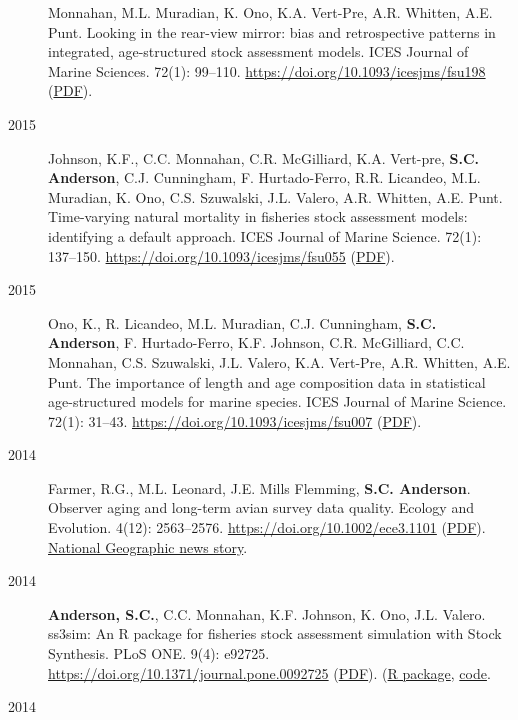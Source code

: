 \begin{description}
Monnahan, M.L. Muradian, K. Ono, K.A. Vert-Pre, A.R. Whitten, A.E. Punt.
Looking in the rear-view mirror: bias and retrospective patterns in
integrated, age-structured stock assessment models. ICES Journal of
Marine Sciences. 72(1): 99--110.
\url{https://doi.org/10.1093/icesjms/fsu198}
(\href{https://sean.updog.co/papers/Hurtado-Ferro_etal_2014_retrospective.pdf}{PDF}).
\item[2015]
Johnson, K.F., C.C. Monnahan, C.R. McGilliard, K.A. Vert-pre,
\textbf{S.C. Anderson}, C.J. Cunningham, F. Hurtado-Ferro, R.R.
Licandeo, M.L. Muradian, K. Ono, C.S. Szuwalski, J.L. Valero, A.R.
Whitten, A.E. Punt. Time-varying natural mortality in fisheries stock
assessment models: identifying a default approach. ICES Journal of
Marine Science. 72(1): 137--150.
\url{https://doi.org/10.1093/icesjms/fsu055}
(\href{http://icesjms.oxfordjournals.org/content/early/2014/04/09/icesjms.fsu055.full.pdf?keytype=ref\&ijkey=NEXmZIkz3289u3z}{PDF}).
\item[2015]
Ono, K., R. Licandeo, M.L. Muradian, C.J. Cunningham, \textbf{S.C.
Anderson}, F. Hurtado-Ferro, K.F. Johnson, C.R. McGilliard, C.C.
Monnahan, C.S. Szuwalski, J.L. Valero, K.A. Vert-Pre, A.R. Whitten, A.E.
Punt. The importance of length and age composition data in statistical
age-structured models for marine species. ICES Journal of Marine
Science. 72(1): 31--43. \url{https://doi.org/10.1093/icesjms/fsu007}
(\href{http://icesjms.oxfordjournals.org/content/early/2014/02/20/icesjms.fsu007.full.pdf}{PDF}).
\item[2014]
Farmer, R.G., M.L. Leonard, J.E. Mills Flemming, \textbf{S.C. Anderson}.
Observer aging and long-term avian survey data quality. Ecology and
Evolution. 4(12): 2563--2576. \url{https://doi.org/10.1002/ece3.1101}
(\href{http://onlinelibrary.wiley.com/doi/10.1002/ece3.1101/pdf}{PDF}).
\href{http://news.nationalgeographic.com/news/2014/08/140805-aging-birders-breeding-bird-survey-volunteers-science/}{National
Geographic news story}.
\item[2014]
\textbf{Anderson, S.C.}, C.C. Monnahan, K.F. Johnson, K. Ono, J.L.
Valero. ss3sim: An R package for fisheries stock assessment simulation
with Stock Synthesis. PLoS ONE. 9(4): e92725.
\url{https://doi.org/10.1371/journal.pone.0092725}
(\href{http://www.plosone.org/article/fetchObject.action?uri=info\%3Adoi\%2F10.1371\%2Fjournal.pone.0092725\&representation=PDF}{PDF}).
(\href{http://cran.r-project.org/web/packages/ss3sim/index.html}{R
package}, \href{https://github.com/ss3sim/ss3sim}{code}.
\item[2014]

\end{description}
